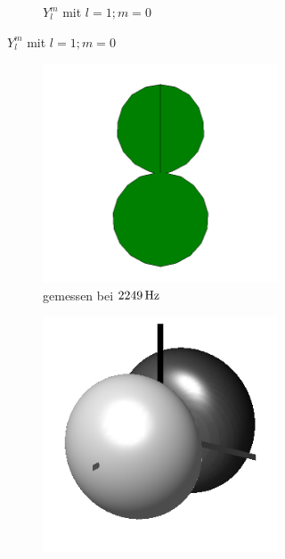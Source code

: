 \documentclass[numbers=noenddot,12pt,a4paper]{scrartcl}
\begin{document}
\begin{figure}[H]
\begin{subfigure}[h]{0.3\textwidth}
\begin{subfigure}[b]{\textwidth}
			\caption{$Y_l^m$ mit $l=1;m=0$} \label{img:l1m0y}
		\end{subfigure}
	\end{subfigure}
	\begin{subfigure}[h]{0.3\textwidth}
		\begin{subfigure}[b]{\textwidth}
			\includegraphics[width=\textwidth]{messwerte/2249Hzl1m+-1.png}
			\caption{gemessen bei $\unit[2249]{Hz}$} \label{img:l1m1}
		\end{subfigure}
		\begin{subfigure}[b]{\textwidth}
			\includegraphics[width=\textwidth]{Spherical_Harmonics_deg3l1m1.png}

\end{subfigure}
\end{subfigure}
\end{figure}
\end{document}

